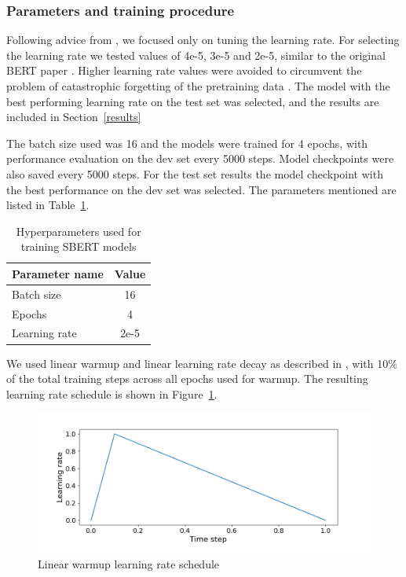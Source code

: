 \documentclass[10pt, a4paper]{article}
\begin{document}
\subsubsection{Parameters and training procedure}

Following advice from \citet{gkouti2024should}, we focused only on tuning the learning rate. For selecting the learning rate we tested values of 4e-5, 3e-5 and 2e-5, similar to the original BERT paper \cite{devlin2018bert}.
Higher learning rate values were avoided to circumvent the problem of catastrophic forgetting of the pretraining data \citep{sun2019fine}.
The model with the best performing learning rate on the test set was selected, and the results are included in Section~\ref{results}

The batch size used was 16 and the models were trained for 4 epochs, with performance evaluation on the dev set every 5000 steps. Model checkpoints were also saved every 5000 steps.
For the test set results the model checkpoint with the best performance on the dev set was selected. The parameters mentioned are listed in Table~\ref{tab:train-params}.

\begin{table}
\caption{Hyperparameters used for training SBERT models}
\label{tab:train-params}
\begin{center}
\begin{tabular}{lc}
\toprule
\textbf{Parameter name} & \textbf{Value} \\
\midrule
Batch size   & 16 \\
Epochs  & 4 \\
Learning rate & 2e-5 \\
\bottomrule
\end{tabular}
\end{center}
\end{table}

We used linear warmup and linear learning rate decay as described in \citet{devlin2018bert}, with 10\% of the total training steps across all epochs used for warmup.
The resulting learning rate schedule is shown in Figure~\ref{fig:warmup-schedule}.

\begin{figure}
\begin{center}
\includegraphics[width=\columnwidth]{figures/warmup-schedule.png}
\caption{Linear warmup learning rate schedule}
\label{fig:warmup-schedule}
\end{center}
\end{figure}
\end{document}
